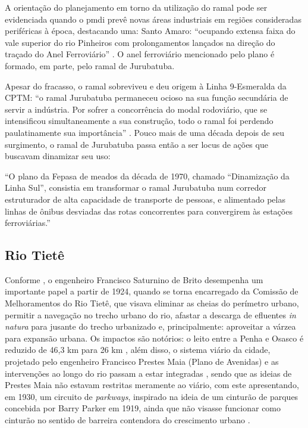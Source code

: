\documentclass[
article,			%
11pt,				%
oneside,			%
a4paper,			%
english,			%
brazil,				%
sumario=tradicional
]{abntex2}
\begin{document}
	A orientação do planejamento em torno da utilização do ramal pode ser evidenciada quando o \gls{pmdi} prevê novas áreas industriais em regiões consideradas periféricas à época, destacando uma: Santo Amaro: ``ocupando extensa faixa do vale superior do rio Pinheiros com prolongamentos lançados na direção do traçado do Anel Ferroviário'' \cite[p. 8--9]{gegran1970a}. O anel ferroviário mencionado pelo plano é formado, em parte, pelo ramal de Jurubatuba.
	
	Apesar do fracasso, o ramal sobreviveu e deu origem à Linha 9-Esmeralda da CPTM: ``o ramal Jurubatuba permaneceu ocioso na sua função secundária de servir a indústria. Por sofrer a concorrência do modal rodoviário, que se intensificou simultaneamente a sua construção, todo o ramal foi perdendo paulatinamente sua importância'' \cite[p.141]{requena2016a}. Pouco mais de uma década depois de seu surgimento, o ramal de Jurubatuba passa então a ser locus de ações que buscavam dinamizar seu uso:
	
	\begin{citacao}
		``O plano da Fepasa de meados da década de 1970, chamado ``Dinamização da Linha Sul'', consistia em transformar o ramal Jurubatuba num corredor estruturador de alta capacidade de transporte de pessoas, e alimentado pelas linhas de ônibus desviadas das rotas concorrentes para convergirem às estações ferroviárias.'' \cite[p.143]{requena2016a}
	\end{citacao}
	
	\subsection{Rio Tietê} \label{s2:riotiete}
	
	
	Conforme , o engenheiro Francisco Saturnino de Brito desempenha um importante papel a partir de 1924, quando se torna encarregado da Comissão de Melhoramentos do Rio Tietê, que visava eliminar as cheias do perímetro urbano, permitir a navegação no trecho urbano do rio, afastar a descarga de efluentes \textit{in natura} para jusante do trecho urbanizado e, principalmente: aproveitar a várzea para expansão urbana. Os impactos são notórios: o leito entre a Penha e Osasco é reduzido de 46,3 km para 26 km \cite[p. 158]{brocaneli2007a}, além disso, o sistema viário da cidade, projetado pelo engenheiro Francisco Prestes Maia (Plano de Avenidas) e as intervenções ao longo do rio passam a estar integradas \cite[p. 158]{brocaneli2007a}, sendo que as ideias de Prestes Maia não estavam restritas meramente ao viário, com este apresentando, em 1930, um circuito de \textit{parkways}, inspirado na ideia de um cinturão de parques concebida por Barry Parker em 1919, ainda que não visasse funcionar como cinturão no sentido de barreira contendora do crescimento urbano \cite[p. 158]{brocaneli2007a}.
	
\end{document}
